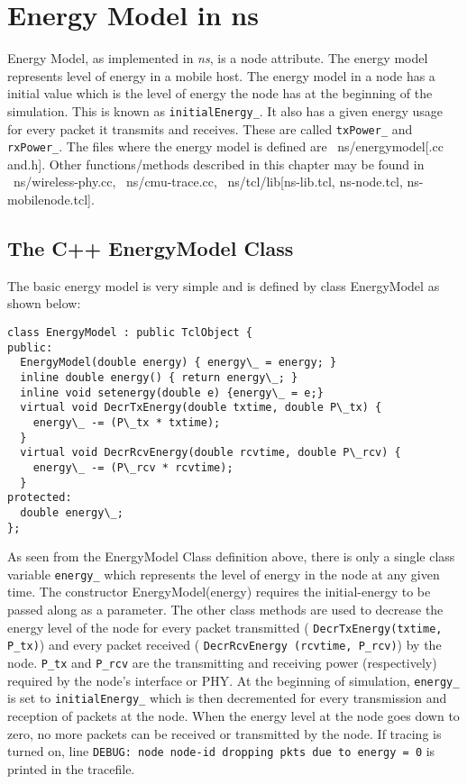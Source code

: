\chapter{Energy Model in ns}
\label{chap:enerymodel}

Energy Model, as implemented in \emph{ns}, is a node attribute. The
energy model represents level of energy in a mobile host. The energy
model in a node has a initial value which is the level of energy the node
has at the beginning of the simulation. This is known as
{\tt initialEnergy\_}.
It also has a given energy usage
for every packet it transmits and receives. These are called
{\tt txPower\_} and {\tt rxPower\_}.
The files where the energy model is defined are ~ns/energymodel[.cc and.h].
Other functions/methods described in this chapter may be found in
~ns/wireless-phy.cc, ~ns/cmu-trace.cc, ~ns/tcl/lib[ns-lib.tcl, 
ns-node.tcl, ns-mobilenode.tcl].


\section{The C++ EnergyModel Class}
\label{sec:c++energymodel}

The basic energy model is very simple and is defined by class EnergyModel
as shown below:

\begin{verbatim}
class EnergyModel : public TclObject {
public:
  EnergyModel(double energy) { energy\_ = energy; }
  inline double energy() { return energy\_; }
  inline void setenergy(double e) {energy\_ = e;}
  virtual void DecrTxEnergy(double txtime, double P\_tx) {
    energy\_ -= (P\_tx * txtime);
  }
  virtual void DecrRcvEnergy(double rcvtime, double P\_rcv) {
    energy\_ -= (P\_rcv * rcvtime);
  }
protected:
  double energy\_;
};   
\end{verbatim}

As seen from the EnergyModel Class definition above, there is only a
single class variable {\tt energy\_} which represents the
level of energy in the node at any given time. The constructor
EnergyModel(energy) requires the initial-energy to be passed along as a 
parameter. The other class methods are
used to decrease the energy level of the node for every packet transmitted
( {\tt DecrTxEnergy(txtime, P\_tx)}) and every packet received (
{\tt DecrRcvEnergy (rcvtime, P\_rcv)}) by
the node. {\tt P\_tx} and {\tt P\_rcv} are the
transmitting and
receiving power (respectively) required by the node's interface or PHY.
At the beginning of simulation, {\tt energy\_} is set to
{\tt initialEnergy\_} which is then
decremented for every transmission and reception of packets at the node.
When the energy level at the node goes down to zero, no more packets can
be received or transmitted by the node. If tracing is turned on, line
{\tt DEBUG: node \<node-id\> dropping pkts due to energy = 0}
is printed in the tracefile.


